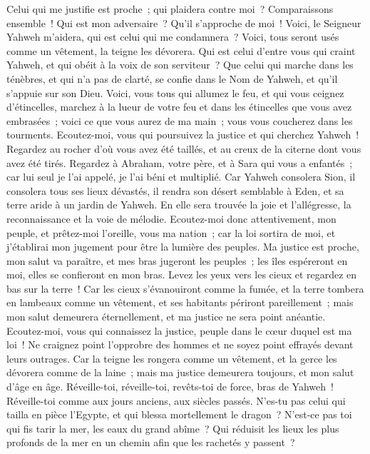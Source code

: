 \begin{multicols}{2}
Celui qui me justifie est proche~; qui plaidera contre moi~? Comparaissons ensemble~! Qui est mon adversaire~? Qu'il s'approche de moi~!
Voici, le Seigneur Yahweh m'aidera, qui est celui qui me condamnera~? Voici, tous seront usés comme un vêtement, la teigne les dévorera.
Qui est celui d'entre vous qui craint Yahweh, et qui obéit à la voix de son serviteur~? Que celui qui marche dans les ténèbres, et qui n'a pas de clarté, se confie dans le Nom de Yahweh, et qu'il s'appuie sur son Dieu.
Voici, vous tous qui allumez le feu, et qui vous ceignez d'étincelles, marchez à la lueur de votre feu et dans les étincelles que vous avez embrasées~; voici ce que vous aurez de ma main~; vous vous coucherez dans les tourments.
\VerseOne{}Ecoutez-moi, vous qui poursuivez la justice et qui cherchez Yahweh~! Regardez au rocher d'où vous avez été taillés, et au creux de la citerne dont vous avez été tirés.
Regardez à Abraham, votre père, et à Sara qui vous a enfantés~; car lui seul je l'ai appelé, je l'ai béni et multiplié.
Car Yahweh consolera Sion, il consolera tous ses lieux dévastés, il rendra son désert semblable à Eden, et sa terre aride à un jardin de Yahweh. En elle sera trouvée la joie et l'allégresse, la reconnaissance et la voie de mélodie.
Ecoutez-moi donc attentivement, mon peuple, et prêtez-moi l'oreille, vous ma nation~; car la loi sortira de moi, et j'établirai mon jugement pour être la lumière des peuples.
Ma justice est proche, mon salut va paraître, et mes bras jugeront les peuples~; les îles espéreront en moi, elles se confieront en mon bras.
Levez les yeux vers les cieux et regardez en bas sur la terre~! Car les cieux s'évanouiront comme la fumée, et la terre tombera en lambeaux comme un vêtement, et ses habitants périront pareillement~; mais mon salut demeurera éternellement, et ma justice ne sera point anéantie.
Ecoutez-moi, vous qui connaissez la justice, peuple dans le cœur duquel est ma loi~! Ne craignez point l'opprobre des hommes et ne soyez point effrayés devant leurs outrages.
Car la teigne les rongera comme un vêtement, et la gerce les dévorera comme de la laine~; mais ma justice demeurera toujours, et mon salut d'âge en âge.
Réveille-toi, réveille-toi, revêts-toi de force, bras de Yahweh~! Réveille-toi comme aux jours anciens, aux siècles passés. N'es-tu pas celui qui tailla en pièce l'Egypte, et qui blessa mortellement le dragon~?
N'est-ce pas toi qui fis tarir la mer, les eaux du grand abîme~? Qui réduisit les lieux les plus profonds de la mer en un chemin afin que les rachetés y passent~?

\end{multicols}
